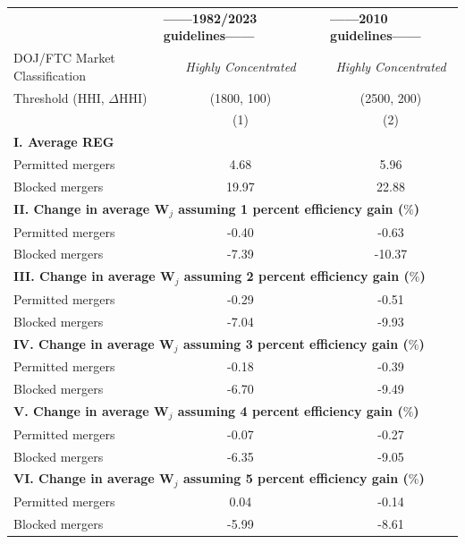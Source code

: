 \begin{tabular}{l @{\hspace{2em}} c @{\hspace{1.5em}}c}
\toprule
 & \multicolumn{1}{l}{\textbf{{------1982/2023 guidelines------ $\quad$ }}} & \multicolumn{1}{l}{\textbf{{------2010 guidelines------}}} \\ 
DOJ/FTC Market Classification & \textit{Highly Concentrated} & \textit{Highly Concentrated} \\ 
Threshold (HHI, $\Delta$HHI) & (1800, 100) & (2500, 200) \\ 
 & (1) & (2) \\ 
\midrule
\multicolumn{3}{l}{\textbf{I. Average REG}} \\ 
Permitted mergers & 4.68 & 5.96  \\ 
Blocked mergers & 19.97 & 22.88  \\ 
\midrule
\multicolumn{3}{l}{\textbf{II. Change in average $\mathbf{W}_j$ assuming 1 percent efficiency gain ($\%$)}} \\ 
Permitted mergers & -0.40 & -0.63 \\ 
Blocked mergers & -7.39 & -10.37 \\ 
\midrule
\multicolumn{3}{l}{\textbf{III. Change in average $\mathbf{W}_j$ assuming 2 percent efficiency gain ($\%$)}} \\ 
Permitted mergers & -0.29 & -0.51 \\ 
Blocked mergers & -7.04 & -9.93 \\ 
\midrule
\multicolumn{3}{l}{\textbf{IV. Change in average $\mathbf{W}_j$ assuming 3 percent efficiency gain ($\%$)}} \\ 
Permitted mergers & -0.18 & -0.39 \\ 
Blocked mergers & -6.70 & -9.49 \\ 
\midrule
\multicolumn{3}{l}{\textbf{V. Change in average $\mathbf{W}_j$ assuming 4 percent efficiency gain ($\%$)}} \\ 
Permitted mergers & -0.07 & -0.27 \\ 
Blocked mergers & -6.35 & -9.05 \\ 
\midrule
\multicolumn{3}{l}{\textbf{VI. Change in average $\mathbf{W}_j$ assuming 5 percent efficiency gain ($\%$)}} \\ 
Permitted mergers & 0.04 & -0.14 \\ 
Blocked mergers & -5.99 & -8.61 \\ 
\bottomrule 
\end{tabular}